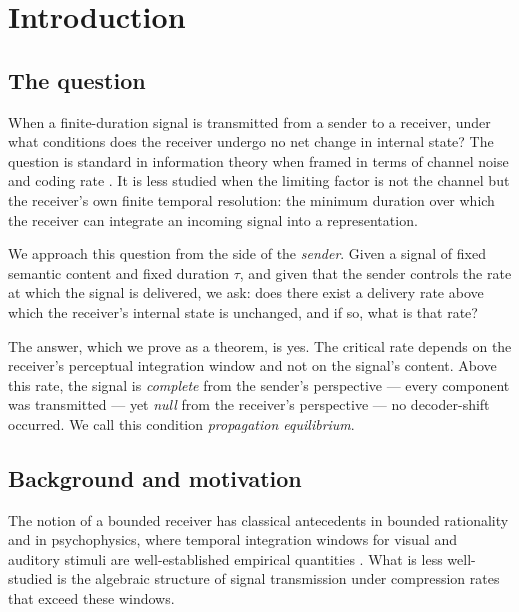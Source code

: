 \documentclass[twocolumn,11pt,a4paper]{article}
\theoremstyle{main}
\theoremstyle{definition}
\theoremstyle{remark}
\begin{document}
\section{Introduction}
\label{sec:intro}

\subsection{The question}

When a finite-duration signal is transmitted from a sender to a receiver,
under what conditions does the receiver undergo no net change in internal
state? The question is standard in information theory when framed in
terms of channel noise and coding rate
\citep{shannon1948,cover2006}. It is less studied when the limiting
factor is not the channel but the receiver's own finite temporal
resolution: the minimum duration over which the receiver can integrate
an incoming signal into a representation.

We approach this question from the side of the \emph{sender}. Given a
signal of fixed semantic content and fixed duration $\tau$, and given
that the sender controls the rate at which the signal is delivered, we
ask: does there exist a delivery rate above which the receiver's internal
state is unchanged, and if so, what is that rate?

The answer, which we prove as a theorem, is yes. The critical rate
depends on the receiver's perceptual integration window and not on the
signal's content. Above this rate, the signal is \emph{complete} from
the sender's perspective --- every component was transmitted --- yet
\emph{null} from the receiver's perspective --- no decoder-shift
occurred. We call this condition \emph{propagation equilibrium}.

\subsection{Background and motivation}

The notion of a bounded receiver has classical antecedents in bounded
rationality \citep{simon1955,simon1956} and in psychophysics, where
temporal integration windows for visual and auditory stimuli are
well-established empirical quantities \citep{fechner1860,efron1970,
potter1975,thorpe1996}. What is less well-studied is the algebraic
structure of signal transmission under compression rates that exceed
these windows.
\end{document}
